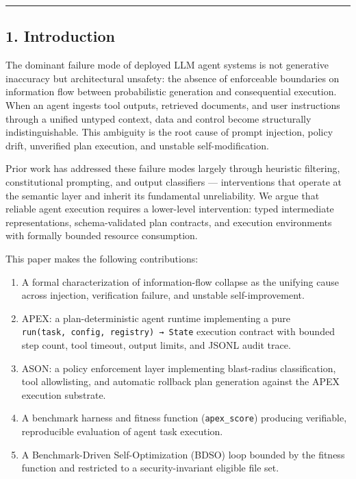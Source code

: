\begin{center}\rule{0.5\linewidth}{0.5pt}\end{center}

\subsection{1. Introduction}\label{introduction}

The dominant failure mode of deployed LLM agent systems is not
generative inaccuracy but architectural unsafety: the absence of
enforceable boundaries on information flow between probabilistic
generation and consequential execution. When an agent ingests tool
outputs, retrieved documents, and user instructions through a unified
untyped context, data and control become structurally indistinguishable.
This ambiguity is the root cause of prompt injection, policy drift,
unverified plan execution, and unstable self-modification.

Prior work has addressed these failure modes largely through heuristic
filtering, constitutional prompting, and output classifiers ---
interventions that operate at the semantic layer and inherit its
fundamental unreliability. We argue that reliable agent execution
requires a lower-level intervention: typed intermediate representations,
schema-validated plan contracts, and execution environments with
formally bounded resource consumption.

This paper makes the following contributions:

\begin{enumerate}
\def\labelenumi{\arabic{enumi}.}
\tightlist
\item
  A formal characterization of information-flow collapse as the unifying
  cause across injection, verification failure, and unstable
  self-improvement.
\item
  APEX: a plan-deterministic agent runtime implementing a pure
  \texttt{run(task,\ config,\ registry)\ →\ State} execution contract
  with bounded step count, tool timeout, output limits, and JSONL audit
  trace.
\item
  ASON: a policy enforcement layer implementing blast-radius
  classification, tool allowlisting, and automatic rollback plan
  generation against the APEX execution substrate.
\item
  A benchmark harness and fitness function (\texttt{apex\_score})
  producing verifiable, reproducible evaluation of agent task execution.
\item
  A Benchmark-Driven Self-Optimization (BDSO) loop bounded by the
  fitness function and restricted to a security-invariant eligible file
  set.
\end{enumerate}


